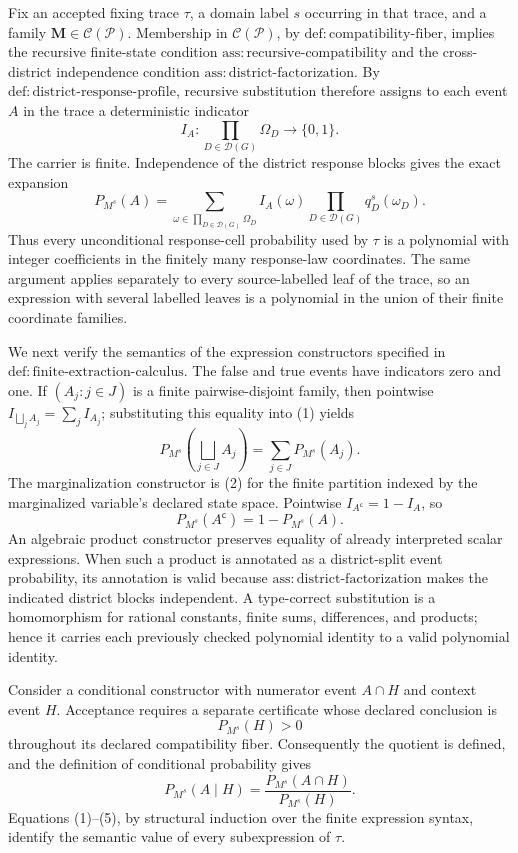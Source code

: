 Fix an accepted fixing trace \(\tau\), a domain label \(s\) occurring in that trace, and a family \(\mathbf M\in\mathcal C(\mathcal P)\).  Membership in \(\mathcal C(\mathcal P)\), by \(\mathrm{def:compatibility\text{-}fiber}\), implies the recursive finite-state condition \(\mathrm{ass:recursive\text{-}compatibility}\) and the cross-district independence condition \(\mathrm{ass:district\text{-}factorization}\).  By \(\mathrm{def:district\text{-}response\text{-}profile}\), recursive substitution therefore assigns to each event \(A\) in the trace a deterministic indicator
\[
 I_A:\prod_{D\in\mathcal D(G)}\Omega_D\longrightarrow\{0,1\}.
\]
The carrier is finite.  Independence of the district response blocks gives the exact expansion
\[
 P_{M^s}(A)
 =\sum_{\omega\in\prod_{D\in\mathcal D(G)}\Omega_D}
 I_A(\omega)\prod_{D\in\mathcal D(G)}q_D^s(\omega_D).
\tag{1}
\]
Thus every unconditional response-cell probability used by \(\tau\) is a polynomial with integer coefficients in the finitely many response-law coordinates.  The same argument applies separately to every source-labelled leaf of the trace, so an expression with several labelled leaves is a polynomial in the union of their finite coordinate families.

We next verify the semantics of the expression constructors specified in \(\mathrm{def:finite\text{-}extraction\text{-}calculus}\).  The false and true events have indicators zero and one.  If \((A_j:j\in J)\) is a finite pairwise-disjoint family, then pointwise \(I_{\bigsqcup_j A_j}=\sum_j I_{A_j}\); substituting this equality into (1) yields
\[
 P_{M^s}\!\left(\bigsqcup_{j\in J}A_j\right)
 =\sum_{j\in J}P_{M^s}(A_j).
\tag{2}
\]
The marginalization constructor is (2) for the finite partition indexed by the marginalized variable's declared state space.  Pointwise \(I_{A^{\mathsf c}}=1-I_A\), so
\[
 P_{M^s}(A^{\mathsf c})=1-P_{M^s}(A).
\tag{3}
\]
An algebraic product constructor preserves equality of already interpreted scalar expressions.  When such a product is annotated as a district-split event probability, its annotation is valid because \(\mathrm{ass:district\text{-}factorization}\) makes the indicated district blocks independent.  A type-correct substitution is a homomorphism for rational constants, finite sums, differences, and products; hence it carries each previously checked polynomial identity to a valid polynomial identity.

Consider a conditional constructor with numerator event \(A\cap H\) and context event \(H\).  Acceptance requires a separate certificate whose declared conclusion is
\[
 P_{M^s}(H)>0
\tag{4}
\]
throughout its declared compatibility fiber.  Consequently the quotient is defined, and the definition of conditional probability gives
\[
 P_{M^s}(A\mid H)
 =\frac{P_{M^s}(A\cap H)}{P_{M^s}(H)}.
\tag{5}
\]
Equations (1)--(5), by structural induction over the finite expression syntax, identify the semantic value of every subexpression of \(\tau\).


